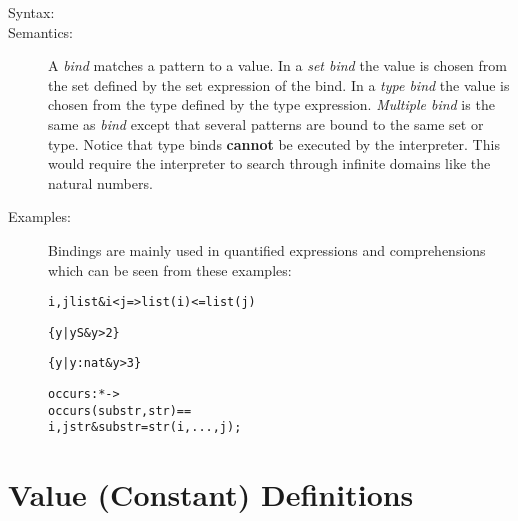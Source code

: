 \documentclass[\pformat,12pt]{article}
\begin{document}
\begin{description}
\item[Syntax:]







\item[Semantics:] A {\it bind} matches a pattern to a value. In a {\it
    set bind} the value is chosen from the set defined by the set
    expression of the bind. In a {\it type bind} the value is chosen
    from the type defined by the type expression.  {\it Multiple bind}
    is the same as {\it bind} except that several patterns are bound
    to the same set or type.  Notice that type binds {\bf cannot} be
    executed by the interpreter.  This would require the interpreter
    to search through infinite domains like the natural numbers.

\item[Examples:] Bindings are mainly used in quantified expressions and
  comprehensions which can be seen from these examples:
  \begin{alltt}
     i, j  list \& i < j => list(i) <= list(j)
      
    \{ y | y  S & y > 2 \}

    \{ y | y: nat & y > 3 \}

    occurs :  *  -> 
    occurs (substr,str) ==
       i,j  str & substr = str(i,...,j);

  \end{alltt}
\end{description}

\section{Value (Constant) Definitions} \label{valuedef}
\end{document}
